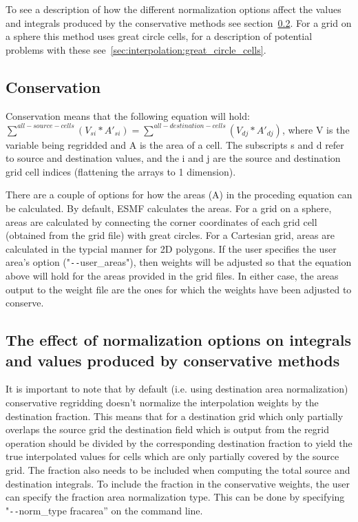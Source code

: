 To see a description of how the different normalization options affect the values and integrals produced by the conservative methods see section~\ref{sec:rwg:conservative_norm_opts}. For a grid on a sphere this method uses great circle cells, for a description of potential problems with these see~\ref{sec:interpolation:great_circle_cells}.

\subsection{Conservation}\label{sec:rwg:conservation}
 Conservation means that the following equation will hold:
  $\sum^{all-source-cells}(V_{si}*A'_{si}) = \sum^{all-destination-cells}(V_{dj}*A'_{dj})$, where
 V is the variable being regridded and A is the area of a cell.  
 The subscripts s and d refer to source and destination values, and the i and j are the source
 and destination grid cell indices (flattening the arrays to 1 dimension). 

 There are a couple of options for how the areas (A) in the proceding equation can be calculated. By default, ESMF calculates the areas. For a grid on a sphere, 
areas are calculated by connecting the corner coordinates of each grid cell (obtained from the grid file) with great circles. For a Cartesian grid, areas are calculated
in the typcial manner for 2D polygons. If the user specifies the user area's option ("\verb+--+user\_areas"), then weights will be adjusted so that the equation above 
will hold for the areas provided in the grid files. In either case, the areas output to the weight file are the ones for which the weights have been adjusted to conserve.

\subsection{The effect of normalization options on integrals and values produced by conservative methods}\label{sec:rwg:conservative_norm_opts}
 It is important to note that by default (i.e. using destination area normalization) conservative regridding doesn't normalize the interpolation weights by the destination fraction. This means that for a destination grid which only partially overlaps the source grid the destination field which is output from the regrid operation should be divided by the corresponding destination fraction to yield the true interpolated values for cells which are only partially covered by the source grid.
The fraction also needs to be included when computing the total source and destination integrals. To include the fraction in the conservative weights, the user can specify the fraction area normalization type. This can be done by specifying "\verb+--+norm\_type fracarea'' on the command line. 

